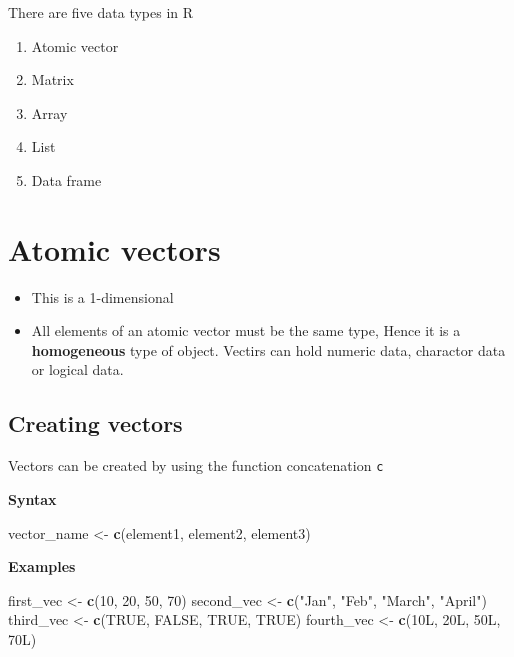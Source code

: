 \documentclass[]{book}
\newenvironment{Shaded}{\begin{snugshade}}{\end{snugshade}}
\newcommand{\DecValTok}[1]{\textcolor[rgb]{0.00,0.00,0.81}{#1}}
\newcommand{\KeywordTok}[1]{\textcolor[rgb]{0.13,0.29,0.53}{\textbf{#1}}}
\newcommand{\NormalTok}[1]{#1}
\newcommand{\OtherTok}[1]{\textcolor[rgb]{0.56,0.35,0.01}{#1}}
\newcommand{\StringTok}[1]{\textcolor[rgb]{0.31,0.60,0.02}{#1}}
\begin{document}
There are five data types in R

\begin{enumerate}
\def\labelenumi{\arabic{enumi}.}
\item
  Atomic vector
\item
  Matrix
\item
  Array
\item
  List
\item
  Data frame
\end{enumerate}

\hypertarget{atomic-vectors}{%
\section{Atomic vectors}\label{atomic-vectors}}

\begin{itemize}
\item
  This is a 1-dimensional
\item
  All elements of an atomic vector must be the same type, Hence it is a \textbf{homogeneous} type of object. Vectirs can hold numeric data, charactor data or logical data.
\end{itemize}

\hypertarget{creating-vectors}{%
\subsection{Creating vectors}\label{creating-vectors}}

Vectors can be created by using the function concatenation \texttt{c}

\textbf{Syntax}

\begin{Shaded}
\begin{Highlighting}[]
\NormalTok{vector_name <-}\StringTok{ }\KeywordTok{c}\NormalTok{(element1, element2, element3)}
\end{Highlighting}
\end{Shaded}

\textbf{Examples}

\begin{Shaded}
\begin{Highlighting}[]
\NormalTok{first_vec <-}\StringTok{ }\KeywordTok{c}\NormalTok{(}\DecValTok{10}\NormalTok{, }\DecValTok{20}\NormalTok{, }\DecValTok{50}\NormalTok{, }\DecValTok{70}\NormalTok{)}
\NormalTok{second_vec <-}\StringTok{ }\KeywordTok{c}\NormalTok{(}\StringTok{"Jan"}\NormalTok{, }\StringTok{"Feb"}\NormalTok{, }\StringTok{"March"}\NormalTok{, }\StringTok{"April"}\NormalTok{)}
\NormalTok{third_vec <-}\StringTok{ }\KeywordTok{c}\NormalTok{(}\OtherTok{TRUE}\NormalTok{, }\OtherTok{FALSE}\NormalTok{, }\OtherTok{TRUE}\NormalTok{, }\OtherTok{TRUE}\NormalTok{)}
\NormalTok{fourth_vec <-}\StringTok{ }\KeywordTok{c}\NormalTok{(10L, 20L, 50L, 70L)}
\end{Highlighting}
\end{Shaded}
\end{document}
